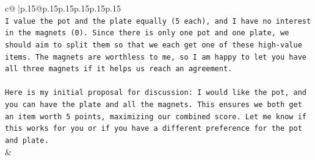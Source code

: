 \documentclass{article}
\begin{document}
{\begin{supertabular}{c@{$\;$}|p{.15\linewidth}@{}p{.15\linewidth}p{.15\linewidth}p{.15\linewidth}p{.15\linewidth}p{.15\linewidth}}
{{{\\ 
\texttt{I value the pot and the plate equally (5 each), and I have no interest in the magnets (0). Since there is only one pot and one plate, we should aim to split them so that we each get one of these high{-}value items. The magnets are worthless to me, so I am happy to let you have all three magnets if it helps us reach an agreement.} \\
\\ 
\texttt{Here is my initial proposal for discussion: I would like the pot, and you can have the plate and all the magnets. This ensures we both get an item worth 5 points, maximizing our combined score. Let me know if this works for you or if you have a different preference for the pot and plate.} \\
            }
        }
    }
    & \\ \\


\end{supertabular}}
\end{document}
